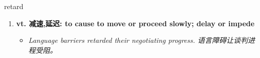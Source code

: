 
\begin{frame}
{\huge retard}
\begin{center}
\begin{enumerate}\Large
  \item \textbf{vt. 减速,延迟: to cause to move or proceed slowly; delay or impede}
  \begin{itemize}
    \item \em{\Large{Language barriers retarded their negotiating progress. 语言障碍让谈判进程受阻。}}
  \end{itemize}
\end{enumerate}
\end{center}
\end{frame}
